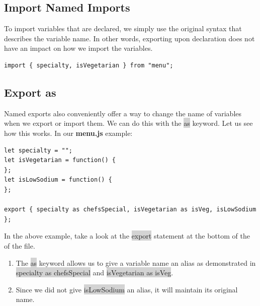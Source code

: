\documentclass[11pt]{article}
\begin{document}
\subsection{Import Named Imports}
To import variables that are declared, we simply use the original syntax that describes the variable name. In other words, exporting upon declaration does not have an impact on how we import the variables.
\begin{lstlisting}
import { specialty, isVegetarian } from "menu";
\end{lstlisting}

\subsection{Export as}
Named exports also conveniently offer a way to change the name of variables when we export or import them. We can do this with the \colorbox{lightgray}{as} keyword. Let us see how this works. In our \textbf{menu.js} example:
\begin{lstlisting}
let specialty = "";
let isVegetarian = function() {
}; 
let isLowSodium = function() {
}; 

export { specialty as chefsSpecial, isVegetarian as isVeg, isLowSodium };
\end{lstlisting}
In the above example, take a look at the \colorbox{lightgray}{export} statement at the bottom of the of the file.
\begin{enumerate}[leftmargin = *]
\item The \colorbox{lightgray}{as} keyword allows us to give a variable name an alias as demonstrated in \colorbox{lightgray}{specialty as chefsSpecial} and \colorbox{lightgray}{isVegetarian as isVeg}.
\item Since we did not give \colorbox{lightgray}{isLowSodium} an alias, it will maintain its original name.
\end{enumerate}
\end{document}
